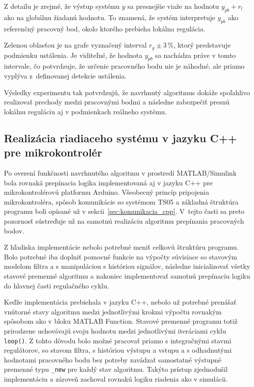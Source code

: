 Z detailu je zrejmé,
že výstup systému $y$
sa presnejšie viaže na hodnotu $y_{pb} + r_l$
ako na globálnu žiadanú hodnotu.
To znamená,
že systém interpretuje $y_{pb}$
ako referenčný pracovný bod,
okolo ktorého prebieha lokálna regulácia.

Zelenou oblasťou je na grafe vyznačený interval
$r_g \pm 3\,\%$,
ktorý predstavuje podmienku ustálenia.
Je viditeľné,
že hodnota $y_{pb}$
sa nachádza práve v tomto intervale,
čo potvrdzuje,
že určenie pracovného bodu nie je náhodné,
ale priamo vyplýva z~definovanej detekcie ustálenia.

Výsledky experimentu tak potvrdzujú,
že navrhnutý algoritmus dokáže spoľahlivo realizovať
prechody medzi pracovnými bodmi
a následne zabezpečiť presnú lokálnu reguláciu
aj v podmienkach reálneho systému.


\subsection{Realizácia riadiaceho systému v jazyku C++ pre mikrokontrolér}
\label{sec:pi_switch_cpp_implementation}

Po overení funkčnosti navrhnutého algoritmu
v prostredí MATLAB/Simulink
bola rovnaká prepínacia logika implementovaná aj
v jazyku C++ pre mikrokontrolérovú platformu Arduino.
Všeobecný princíp pripojenia mikrokontroléra,
spôsob komunikácie so systémom TS05
a základná štruktúra programu
boli opísané už v sekcii~\ref{sec:komunikacia_cpp}.
V~tejto časti sa preto pozornosť sústreďuje už
na samotnú realizáciu algoritmu prepínania pracovných bodov.

Z hľadiska implementácie nebolo potrebné meniť
celkovú štruktúru programu.
Bolo potrebné iba doplniť pomocné funkcie
na výpočty súvisiace so stavovým modelom filtra
a s manipuláciou s históriou signálov,
následne inicializovať všetky stavové premenné algoritmu
a nakoniec implementovať samotnú prepínaciu logiku
do hlavnej časti regulačného cyklu.

Keďže implementácia prebiehala v jazyku C++,
nebolo už potrebné prenášať vnútorné stavy algoritmu
medzi jednotlivými krokmi výpočtu
rovnakým spôsobom ako v bloku MATLAB Function.
Stavové premenné programu totiž prirodzene uchovávajú svoju hodnotu
medzi jednotlivými iteráciami cyklu \texttt{loop()}.
Z tohto dôvodu bolo možné pracovať priamo
s integračnými stavmi regulátorov,
so stavom filtra,
s históriou výstupu a vstupu
a s odhadnutými hodnotami pracovného bodu
bez potreby zavádzať samostatné výstupné premenné
typu \texttt{\_new}
pre každý stav algoritmu.
Takýto prístup zjednodušil implementáciu
a zároveň zachoval rovnakú logiku riadenia
ako v simulácii.

